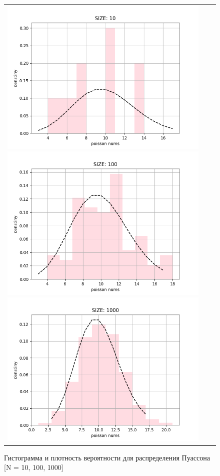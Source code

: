 \begin{itemize}
	\begin{figure}[H]
		\begin{tabular}{ccc}
			\includegraphics[scale=0.333]{task_1/resource/poisson10.png}
			\includegraphics[scale=0.333]{task_1/resource/poisson100.png}
			\includegraphics[scale=0.333]{task_1/resource/poisson1000.png}
		\end{tabular}
		\caption{Гистограмма и плотность вероятности для распределения Пуассона [N = 10, 100, 1000]} 
	\end{figure}
	

\end{itemize}
